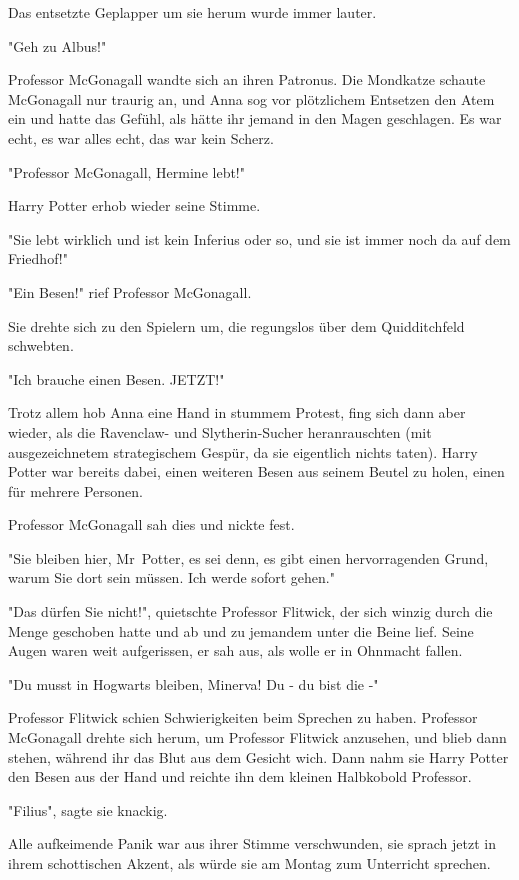 {Das entsetzte Geplapper um sie herum wurde immer lauter.

"Geh zu Albus!"

Professor McGonagall wandte sich an ihren Patronus. Die Mondkatze schaute McGonagall nur traurig an, und Anna sog vor plötzlichem Entsetzen den Atem ein und hatte das Gefühl, als hätte ihr jemand in den Magen geschlagen. Es war echt, es war alles echt, das war kein Scherz.

"Professor McGonagall, Hermine lebt!"

Harry Potter erhob wieder seine Stimme.

"Sie lebt wirklich und ist kein Inferius oder so, und sie ist immer noch da auf dem Friedhof!"

"Ein Besen!" rief Professor McGonagall.

Sie drehte sich zu den Spielern um, die regungslos über dem Quidditchfeld schwebten.

"Ich brauche einen Besen. JETZT!"

Trotz allem hob Anna eine Hand in stummem Protest, fing sich dann aber wieder, als die Ravenclaw- und Slytherin-Sucher heranrauschten (mit ausgezeichnetem strategischem Gespür, da sie eigentlich nichts taten). Harry Potter war bereits dabei, einen weiteren Besen aus seinem Beutel zu holen, einen für mehrere Personen.

Professor McGonagall sah dies und nickte fest.

"Sie bleiben hier, Mr~Potter, es sei denn, es gibt einen hervorragenden Grund, warum Sie dort sein müssen. Ich werde sofort gehen."

"Das dürfen Sie nicht!", quietschte Professor Flitwick, der sich winzig durch die Menge geschoben hatte und ab und zu jemandem unter die Beine lief. Seine Augen waren weit aufgerissen, er sah aus, als wolle er in Ohnmacht fallen.

"Du musst in Hogwarts bleiben, Minerva! Du - du bist die -"

Professor Flitwick schien Schwierigkeiten beim Sprechen zu haben. Professor McGonagall drehte sich herum, um Professor Flitwick anzusehen, und blieb dann stehen, während ihr das Blut aus dem Gesicht wich. Dann nahm sie Harry Potter den Besen aus der Hand und reichte ihn dem kleinen Halbkobold Professor.

"Filius", sagte sie knackig.

Alle aufkeimende Panik war aus ihrer Stimme verschwunden, sie sprach jetzt in ihrem schottischen Akzent, als würde sie am Montag zum Unterricht sprechen.

}
